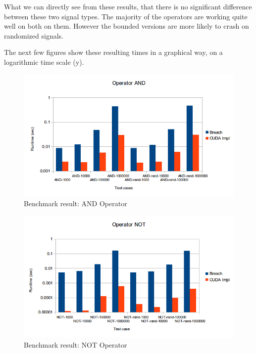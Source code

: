 \documentclass[a4paper,10pt]{article}
\begin{document}
What we can directly see from these results, that there is no significant difference between
these two signal types. The majority of the operators are working quite well on both on them. 
However the bounded versions are more likely to crash on randomized signals. 

The next few figures show these resulting times in a graphical way, on a logarithmic time scale (y).

\begin{figure}[H]
    \includegraphics[scale=0.5]{bm_and.png}
    \caption{
        \label{fig:bm_and}
        Benchmark result: AND Operator}
\end{figure}

\begin{figure}[H]
    \includegraphics[scale=0.5]{bm_not.png}
    \caption{
        \label{fig:bm_not}
        Benchmark result: NOT Operator}
\end{figure}
\end{document}
